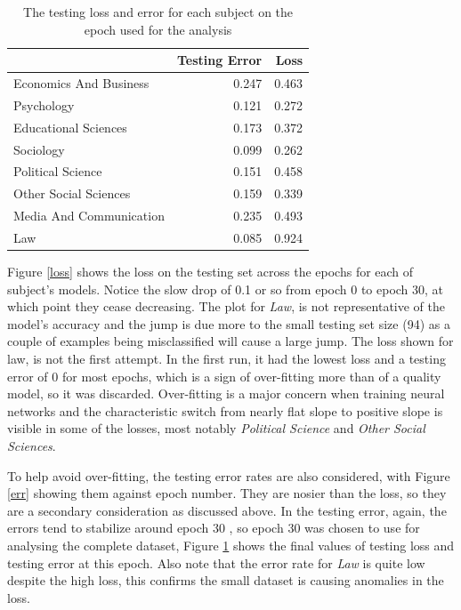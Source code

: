\documentclass[12pt, a4paper]{article}
\begin{document}
\begin{table}[ht]
	\centering
	\begin{adjustbox}{center}
		\begin{tabular}{lrr}
			\toprule
			{} &  Testing Error &   Loss \\
			\midrule
			Economics And Business  &         \num{0.247} & \num{0.463} \\
			Psychology              &         \num{0.121} & \num{0.272} \\
			Educational Sciences    &         \num{0.173} & \num{0.372} \\
			Sociology               &         \num{0.099} & \num{0.262} \\
			Political Science       &         \num{0.151} & \num{0.458} \\
			Other Social Sciences   &         \num{0.159} & \num{0.339} \\
			Media And Communication &         \num{0.235} & \num{0.493} \\
			Law                     &         \num{0.085} & \num{0.924} \\
			\bottomrule
		\end{tabular}
	\end{adjustbox}
	\caption{The testing loss and error for each subject on the epoch used for the analysis}\label{final_loss}
\end{table}

Figure \ref{loss} shows the loss on the testing set across the epochs for each of subject's models. Notice the slow drop of \num{0.1} or so from epoch 0 to epoch 30, at which point they cease decreasing. The plot for \textit{Law}, is not representative of the model's accuracy and the jump is due more to the small testing set size (94) as a couple of examples being misclassified will cause a large jump. The loss shown for law, is not the first attempt. In the first run, it had the lowest loss and a testing error of 0 for most epochs, which is a sign of over-fitting more than of a quality model, so it was discarded. Over-fitting is a major concern when training neural networks \citep{james2013introduction} and the characteristic switch from nearly flat slope to positive slope is visible in some of the losses, most notably \textit{Political Science} and \textit{Other Social Sciences}.

To help avoid over-fitting, the testing error rates are also considered, with Figure \ref{err} showing them against epoch number. They are nosier than the loss, so they are a secondary consideration as discussed above. In the testing error, again, the errors tend to stabilize around epoch 30 , so epoch 30 was chosen to use for analysing the complete dataset, Figure \ref{final_loss} shows the final values of testing loss and testing error at this epoch. Also note that the error rate for \textit{Law} is quite low despite the high loss, this confirms the small dataset is causing anomalies in the loss.
\end{document}
